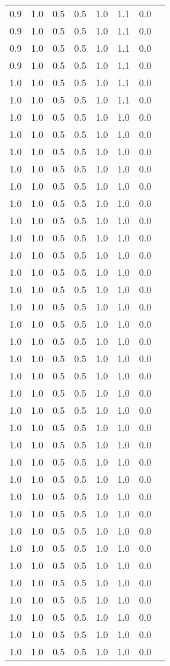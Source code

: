 \begin{tabular}{L{1in}|L{1in}|L{1in}|L{1in}|L{1in}|L{1in}|L{1in}|L{1in}}
0.9&1.0&0.5&0.5&1.0&1.1&0.0\\
0.9&1.0&0.5&0.5&1.0&1.1&0.0\\
0.9&1.0&0.5&0.5&1.0&1.1&0.0\\
0.9&1.0&0.5&0.5&1.0&1.1&0.0\\
1.0&1.0&0.5&0.5&1.0&1.1&0.0\\
1.0&1.0&0.5&0.5&1.0&1.1&0.0\\
1.0&1.0&0.5&0.5&1.0&1.0&0.0\\
1.0&1.0&0.5&0.5&1.0&1.0&0.0\\
1.0&1.0&0.5&0.5&1.0&1.0&0.0\\
1.0&1.0&0.5&0.5&1.0&1.0&0.0\\
1.0&1.0&0.5&0.5&1.0&1.0&0.0\\
1.0&1.0&0.5&0.5&1.0&1.0&0.0\\
1.0&1.0&0.5&0.5&1.0&1.0&0.0\\
1.0&1.0&0.5&0.5&1.0&1.0&0.0\\
1.0&1.0&0.5&0.5&1.0&1.0&0.0\\
1.0&1.0&0.5&0.5&1.0&1.0&0.0\\
1.0&1.0&0.5&0.5&1.0&1.0&0.0\\
1.0&1.0&0.5&0.5&1.0&1.0&0.0\\
1.0&1.0&0.5&0.5&1.0&1.0&0.0\\
1.0&1.0&0.5&0.5&1.0&1.0&0.0\\
1.0&1.0&0.5&0.5&1.0&1.0&0.0\\
1.0&1.0&0.5&0.5&1.0&1.0&0.0\\
1.0&1.0&0.5&0.5&1.0&1.0&0.0\\
1.0&1.0&0.5&0.5&1.0&1.0&0.0\\
1.0&1.0&0.5&0.5&1.0&1.0&0.0\\
1.0&1.0&0.5&0.5&1.0&1.0&0.0\\
1.0&1.0&0.5&0.5&1.0&1.0&0.0\\
1.0&1.0&0.5&0.5&1.0&1.0&0.0\\
1.0&1.0&0.5&0.5&1.0&1.0&0.0\\
1.0&1.0&0.5&0.5&1.0&1.0&0.0\\
1.0&1.0&0.5&0.5&1.0&1.0&0.0\\
1.0&1.0&0.5&0.5&1.0&1.0&0.0\\
1.0&1.0&0.5&0.5&1.0&1.0&0.0\\
1.0&1.0&0.5&0.5&1.0&1.0&0.0\\
1.0&1.0&0.5&0.5&1.0&1.0&0.0\\
1.0&1.0&0.5&0.5&1.0&1.0&0.0\\
1.0&1.0&0.5&0.5&1.0&1.0&0.0\\
1.0&1.0&0.5&0.5&1.0&1.0&0.0\\

\end{tabular}

